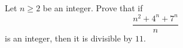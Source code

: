 Let $n \geq 2$ be an integer. Prove that if
$$\frac{n^2+4^n+7^n}{n}$$
is an integer, then it is divisible by $11$.

